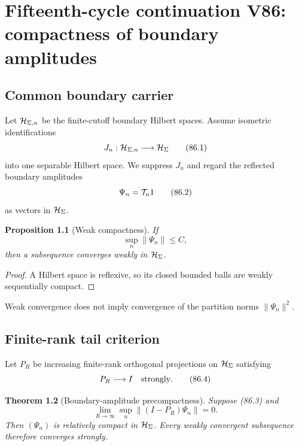 \documentclass[11pt]{article}
\newtheorem{theorem}{Theorem}[section]
\newtheorem{proposition}[theorem]{Proposition}
\theoremstyle{remark}
\begin{document}
\chapter{Fifteenth-cycle continuation V86: compactness of boundary amplitudes}
\label{sec:v15v86}

\section{Common boundary carrier}

Let \({\cal H}_{\Sigma,n}\) be the finite-cutoff boundary Hilbert
spaces.  Assume isometric identifications
\[
 J_n:{\cal H}_{\Sigma,n}\longrightarrow{\cal H}_\Sigma
                                                               \tag{86.1}
\]
into one separable Hilbert space.  We suppress \(J_n\) and regard
the reflected boundary amplitudes
\[
 \Psi_n={\cal T}_n1                                  \tag{86.2}
\]
as vectors in \({\cal H}_\Sigma\).

\begin{proposition}[Weak compactness]
\label{prop:v15v86-weak}
If
\[
 \sup_n\|\Psi_n\|\leq C,                              \tag{86.3}
\]
then a subsequence converges weakly in
\({\cal H}_\Sigma\).
\end{proposition}

\begin{proof}
A Hilbert space is reflexive, so its closed bounded balls are weakly
sequentially compact.
\end{proof}

Weak convergence does not imply convergence of the partition norms
\(\|\Psi_n\|^2\).

\section{Finite-rank tail criterion}

Let \(P_R\) be increasing finite-rank orthogonal projections on
\({\cal H}_\Sigma\) satisfying
\[
 P_R\longrightarrow I\quad\hbox{strongly}.             \tag{86.4}
\]

\begin{theorem}[Boundary-amplitude precompactness]
\label{thm:v15v86-tail}
Suppose (86.3) and
\[
 \lim_{R\to\infty}
 \sup_n\|(I-P_R)\Psi_n\|=0.                           \tag{86.5}
\]
Then \((\Psi_n)\) is relatively compact in
\({\cal H}_\Sigma\).  Every weakly convergent subsequence therefore
converges strongly.
\end{theorem}
\end{document}
